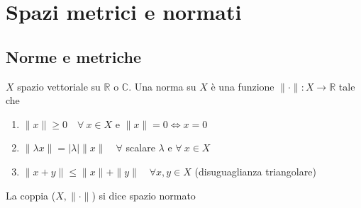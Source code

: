\section{Spazi metrici e normati}
\subsection{Norme e metriche}

\begin{definition}
	
	$X$ spazio vettoriale su $\mathbb{R}$ o $\mathbb{C}$. Una norma su $X$ è una funzione $\parallel \cdot \parallel : X \rightarrow \mathbb{R}$ tale che 
	\begin{enumerate}
		\item $\parallel x \parallel \geq 0 \quad \forall \ x \in X$ e $\parallel x \parallel = 0 \iff x = 0$
		
		\item $\parallel \lambda x \parallel = |\lambda| \parallel x \parallel \quad \forall$ scalare $\lambda$ e $\forall \ x \in X$
		
		\item $\parallel x+y \parallel \leq \parallel x \parallel + \parallel y \parallel \quad \forall x,y \in X$ (disuguaglianza triangolare)
	\end{enumerate}
	La coppia ($X,\parallel \cdot \parallel$) si dice spazio normato
\end{definition}


